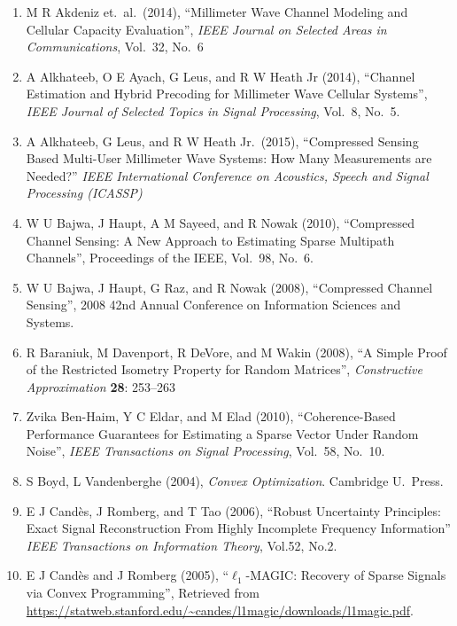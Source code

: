 \begin{enumerate}

\item M R Akdeniz et.\ al.\ (2014), ``Millimeter Wave Channel Modeling and Cellular Capacity Evaluation'', \textit{IEEE Journal on Selected Areas in Communications}, Vol.\ 32, No.\ 6

\item A Alkhateeb, O E Ayach, G Leus, and R W Heath Jr (2014), ``Channel Estimation and Hybrid Precoding for Millimeter Wave Cellular Systems'', \textit{IEEE Journal of Selected Topics in Signal Processing}, Vol.\ 8, No.\ 5.

\item A Alkhateeb, G Leus, and R W Heath Jr.\ (2015), ``Compressed Sensing Based Multi-User Millimeter Wave Systems: How Many Measurements are Needed?'' \textit{IEEE International Conference on Acoustics, Speech and Signal Processing (ICASSP)}

\item W U Bajwa, J Haupt, A M Sayeed, and R Nowak (2010), ``Compressed Channel Sensing: A New Approach to Estimating Sparse Multipath Channels'', Proceedings of the IEEE, Vol.\ 98, No.\ 6.

\item W U Bajwa, J Haupt, G Raz, and R Nowak (2008), ``Compressed Channel Sensing'', 2008 42nd Annual Conference on Information Sciences and Systems.

\item R Baraniuk, M Davenport, R DeVore, and M Wakin (2008), ``A Simple Proof of the Restricted Isometry Property for Random Matrices'', \textit{Constructive Approximation} \textbf{28}: 253–263

\item Zvika Ben-Haim, Y C Eldar, and M Elad (2010), ``Coherence-Based Performance Guarantees for Estimating a Sparse Vector Under Random Noise'', \textit{IEEE Transactions on Signal Processing}, Vol.\ 58, No.\ 10.

\item S Boyd, L Vandenberghe (2004), \textit{Convex Optimization}. Cambridge U.\ Press.

\item E J Cand\`es, J Romberg, and T Tao (2006), ``Robust Uncertainty Principles: Exact Signal Reconstruction From Highly Incomplete Frequency Information'' \textit{IEEE Transactions on Information Theory}, Vol.52, No.2.

\item E J Cand\`es and J Romberg (2005), ``\(\ell_1\)-MAGIC: Recovery of Sparse Signals via Convex Programming'', Retrieved from \url{https://statweb.stanford.edu/~candes/l1magic/downloads/l1magic.pdf}.


\end{enumerate}
